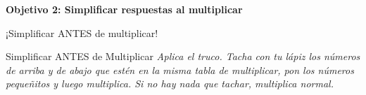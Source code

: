 \documentclass[12pt, letterpaper]{article}
\newenvironment{objetivo}[1]{%
    \begin{tcolorbox}[colback=valblue!10, colframe=valblue, arc=2mm, boxrule=1.5pt]
        {\large\bfseries \ding{118} #1}
    \end{tcolorbox}
}{}
\begin{document}
\begin{objetivo}{Objetivo 2: Simplificar respuestas al multiplicar}
\begin{concepto}{¡Simplificar ANTES de multiplicar!}
\begin{center}
        \end{center}
        
    \end{concepto}
    
    \vspace{0.4cm}
    \newpage
    \begin{practica}{Simplificar ANTES de Multiplicar}
        \textit{Aplica el truco. Tacha con tu lápiz los números de arriba y de abajo que estén en la misma tabla de multiplicar, pon los números pequeñitos y luego multiplica. Si no hay nada que tachar, multiplica normal.}
        

\end{practica}
\end{objetivo}
\end{document}
